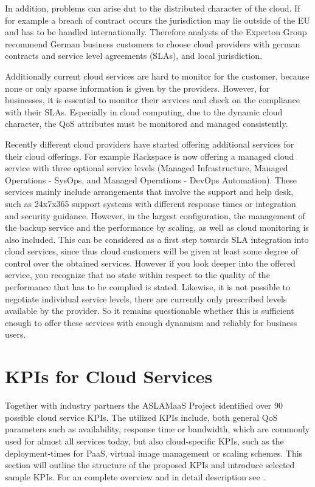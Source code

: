 In addition, problems can arise dut to the distributed character of the cloud. If for example a breach of contract occurs the jurisdiction may lie outside of the EU and has to be handled internationally. Therefore analysts of the Experton Group \cite{Experton} recommend German business customers to choose cloud providers with german contracts and service level agreements (SLAs), and local jurisdiction. 

Additionally current cloud services are hard to monitor for the customer, because none or only sparse information is given by the providers. However, for businesses, it is essential to monitor their services and check on the compliance with their SLAs. Especially in cloud computing, due to the dynamic cloud character, the QoS attributes must be monitored and managed consistently.\cite{wsla}



Recently different cloud providers have started offering additional services for their cloud offerings. For example Rackspace\cite{rackspace15} is now offering a managed cloud service with three optional service levels (Managed Infrastructure, Managed Operations - SysOps, and Managed Operations - DevOps Automation). These services mainly include arrangements that involve the support and help desk, such as  24x7x365 support systems with different response times or integration and security guidance. However, in the largest configuration, the management of the backup service  and the performance by scaling, as well as cloud monitoring is also included. This can be considered as a first step towards SLA integration into cloud services, since thus cloud customers will be given at least some degree of control over the obtained services. However if you look deeper into the offered service, you recognize that no state within respect to the quality of the performance that has to be complied is stated. Likewise, it is not possible to negotiate individual service levels, there are currently only prescribed levels available by the provider. So it remains questionable whether this is sufficient enough to offer these services with enough dynamism and reliably for business users.




\section{KPIs for Cloud Services} \label{Cloud KPIs}
Together with industry partners the ASLAMaaS Project \cite{ASLAMaaS} identified over 90 possible cloud service KPIs.  The utilized KPIs include, both general QoS parameters such as availability, response time or bandwidth, which are commonly used for almost all services today, but also cloud-specific KPIs, such as the deployment-times for PaaS, virtual image management or scaling schemes. This section will outline the structure of the proposed KPIs and introduce selected sample KPIs. For an complete overview and in detail description see \cite{ASLAMaaSDoku}.

